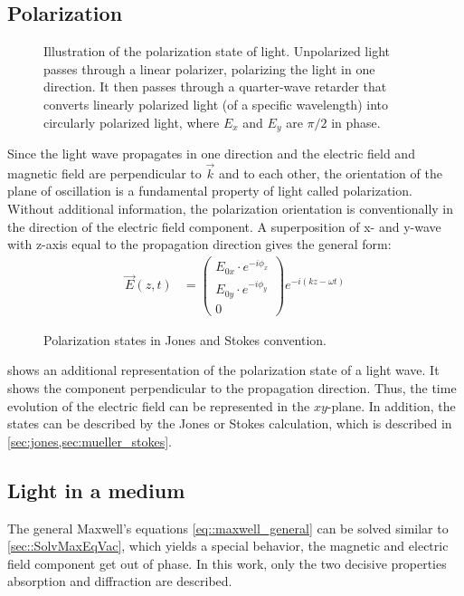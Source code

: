 \subsection{Polarization}\label{sec:polarization}
%
\begin{figure}[!t]
\centering
\setlength{\tikzwidth}{\textwidth}
\caption{Illustration of the polarization state of light. Unpolarized light passes through a linear polarizer, polarizing the light in one direction. It then passes through a quarter-wave retarder that converts linearly polarized light (of a specific wavelength) into circularly polarized light, where $E_x$ and $E_y$ are $\pi/2$ in phase.}
\label{fig:polarization_state}
\end{figure}
%
Since the light wave propagates in one direction and the electric field and magnetic field are perpendicular to $\vec{k}$ and to each other, the orientation of the plane of oscillation is a fundamental property of light called polarization.
Without additional information, the polarization orientation is conventionally in the direction of the electric field component.
A superposition of x- and y-wave with z-axis equal to the propagation direction gives the general form:
\begin{align}
\vec{E}(z,t) &= \begin{pmatrix} E_{0x} \cdot e^{ -i \phi_x } \\ E_{0y} \cdot e^{ -i \phi_y } \\ 0 \end{pmatrix}
e^{ -i (kz - \omega t)}
\end{align}
%
\begin{figure}[!t]
\centering

\caption{Polarization states in Jones and Stokes convention.}
\label{fig:polarization_state_vectors}
\end{figure}
%
 shows an additional representation of the polarization state of a light wave.
It shows the component perpendicular to the propagation direction.
Thus, the time evolution of the electric field can be represented in the $xy$-plane.
In addition, the states can be described by the Jones or Stokes calculation, which is described in \cref{sec:jones,sec:mueller_stokes}.
%
%
%
\subsection{Light in a medium}
%
The general Maxwell's equations \cref{eq::maxwell_general} can be solved similar to \cref{sec::SolvMaxEqVac}, which yields a special behavior, \eg{} the magnetic and electric field component get out of phase.
In this work, only the two decisive properties absorption and diffraction are described.
% 
% 
%
